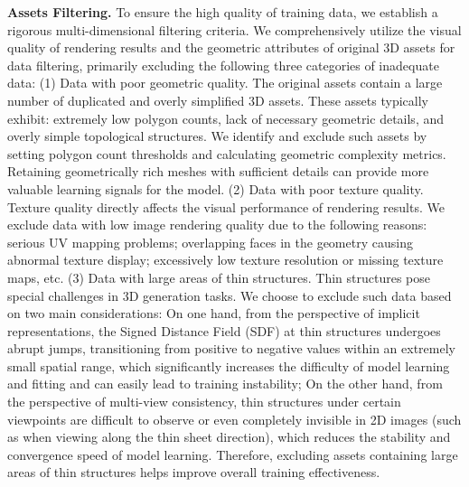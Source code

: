 \documentclass{article} %
\begin{document}
\textbf{Assets Filtering.} To ensure the high quality of training data, we establish a rigorous multi-dimensional filtering criteria. We comprehensively utilize the visual quality of rendering results and the geometric attributes of original 3D assets for data  filtering, primarily excluding the following three categories of inadequate data:
(1) Data with poor geometric quality. The original assets contain a large number of duplicated and overly simplified 3D assets. These assets typically exhibit: extremely low polygon counts, lack of necessary geometric details, and overly simple topological structures. We identify and exclude such assets by setting polygon count thresholds and calculating geometric complexity metrics. Retaining geometrically rich meshes with sufficient details can provide more valuable learning signals for the model.
(2) Data with poor texture quality. Texture quality directly affects the visual performance of rendering results. We exclude data with low image rendering quality due to the following reasons: serious UV mapping problems; overlapping faces in the geometry causing abnormal texture display; excessively low texture resolution or missing texture maps, etc.
(3) Data with large areas of thin structures. Thin structures pose special challenges in 3D generation tasks. We choose to exclude such data based on two main considerations: On one hand, from the perspective of implicit representations, the Signed Distance Field (SDF) at thin structures undergoes abrupt jumps, transitioning from positive to negative values within an extremely small spatial range, which significantly increases the difficulty of model learning and fitting and can easily lead to training instability; On the other hand, from the perspective of multi-view consistency, thin structures under certain viewpoints are difficult to observe or even completely invisible in 2D images (such as when viewing along the thin sheet direction), which reduces the stability and convergence speed of model learning. Therefore, excluding assets containing large areas of thin structures helps improve overall training effectiveness.

\end{document}
